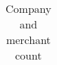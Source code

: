 \begin{center}
\begin{table}[ht!]
\begin{tabular}{lr}
    \end{tabular}
    \caption{Company and merchant count}
    \label{tab:companymerchants}
\end{table}

\end{center}
